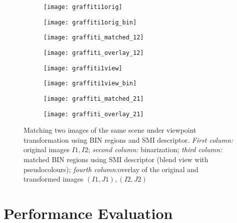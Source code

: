 \documentclass[a4paper,11pt]{article}
\begin{document}
\begin{figure}[h]
 \vspace{-10pt} 
\begin{center}
\begin{subfigure}[b]{0.22\textwidth}
  \texttt{[image: graffiti1orig]}
\end{subfigure}
\begin{subfigure}[b]{0.22\textwidth}
\texttt{[image: graffiti1orig\_bin]}
\end{subfigure}
\begin{subfigure}[b]{0.22\textwidth}
  \texttt{[image: graffiti\_matched\_12]}
\end{subfigure}
\begin{subfigure}[b]{0.22\textwidth}
\texttt{[image: graffiti\_overlay\_12]}
\end{subfigure}
\end{center}
\vspace{-22pt}
\begin{center}
\begin{subfigure}[b]{0.22\textwidth}
  \texttt{[image: graffiti1view]}
\end{subfigure}
\begin{subfigure}[b]{0.22\textwidth}
\texttt{[image: graffiti1view\_bin]}
\end{subfigure}
\begin{subfigure}[b]{0.22\textwidth}
  \texttt{[image: graffiti\_matched\_21]}
\end{subfigure}
\begin{subfigure}[b]{0.22\textwidth}
\texttt{[image: graffiti\_overlay\_21]}
\end{subfigure}
\end{center}
\vspace{-20pt}
\caption{\small Matching two images of the same scene under viewpoint transformation using BIN regions and SMI descriptor. {\em First column:} original images $I1, I2$; {\em second column:} binarization; {\em third column:} matched BIN regions using SMI descriptor (blend view with pseudocolours); {\em fourth column:}overlay of the original and transformed images $(I1, J1), (I2, J2)$ }
\label{fig:matching1}
  \vspace{-12pt}
\end{figure}

\section{Performance Evaluation}
\end{document}
